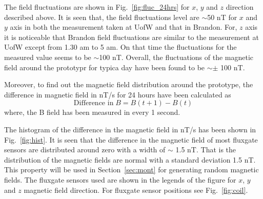 
The field fluctuations are shown in Fig.~\ref{fig:fluc_24hrs} for $x$, $y$ and $z$ direction described above. It is seen that, the field fluctuations level are $\sim$50 nT for $x$ and $y$ axis in both the measurement taken at UofW and that in Brandon. For, $z$ axis it is noticeable that Brandon field fluctuations are similar to the measurement at UofW except from 1.30 am to 5 am. On that time the fluctuations for the measured value seems to be $\sim$100 nT. Overall, the fluctuations of the magnetic field around the prototypr for typica day have been found to be $\sim \pm$ 100 nT.



Moreover, to find out the magnetic field distribution around the prototype, the difference in magnetic field in nT/s for 24 hours have been calculated as 
\begin{equation}
    \text{Difference in}\;B=B(t+1)-B(t)
\end{equation}
where, the B field has been measured in every 1 second.

The histogram of the difference in the magnetic field in nT/s has been shown in Fig.~\ref{fig:hist}. It is seen that the difference in the magnetic field of most fluxgate sensors are distributed around zero with a width of $\sim$ 1.5 nT. That is the distribution of the magnetic fields are normal with a standard deviation 1.5 nT. This property will be used in Section~\ref{sec:mont} for generating random magnetic fields. The fluxgate sensors used are shown in the legends of the figure for $x$, $y$ and $z$ magnetic field direction. For fluxgate sensor positions see Fig.~\ref{fig:coil}.

